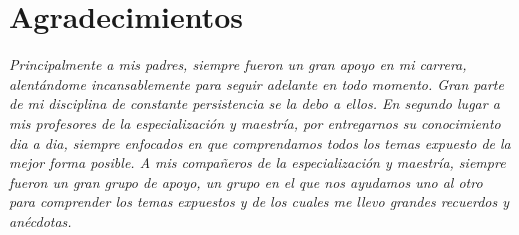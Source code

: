 \chapter*{Agradecimientos}

\hfill \textit{Principalmente a mis padres, siempre fueron un gran apoyo en mi carrera, alentándome incansablemente
	para seguir adelante en todo momento. Gran parte de mi disciplina de constante persistencia se la debo a ellos.
	En segundo lugar a mis profesores de la especialización y maestría, por entregarnos su conocimiento dia a dia,
	siempre enfocados en que comprendamos todos los temas expuesto de la mejor forma posible. A mis compañeros
	de la especialización y maestría, siempre fueron un gran grupo de apoyo, un grupo en el que nos
	ayudamos uno al otro para comprender los temas expuestos y de los cuales me llevo grandes recuerdos y anécdotas.}
